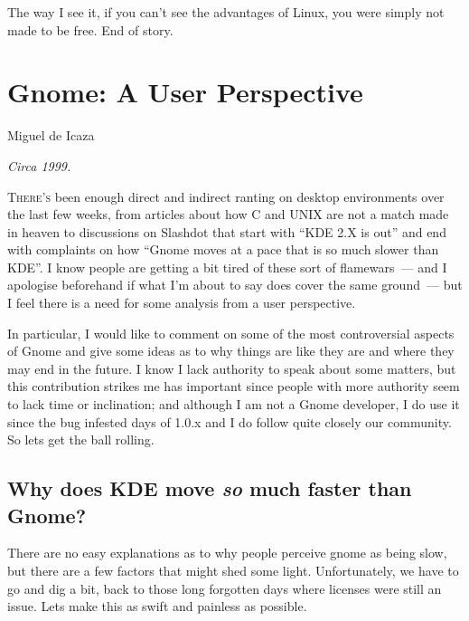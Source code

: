 \documentclass{memoir}
\begin{document}
The way I see it, if you can't see the advantages of Linux, you were
simply not made to be free. End of story.

\chapter{Gnome: A User Perspective}

\begin{epigraphs}
      {Miguel de Icaza}
\end{epigraphs}

\begin{flushright}
  \emph{Circa 1999.}
\end{flushright}

\lettrine{T}{here's} been enough direct and indirect ranting on
desktop environments over the last few weeks, from articles about how
C and UNIX are not a match made in heaven to discussions on Slashdot
that start with ``KDE 2.X is out'' and end with complaints on how
``Gnome moves at a pace that is so much slower than KDE''. I know
people are getting a bit tired of these sort of flamewars~--- and I
apologise beforehand if what I'm about to say does cover the same
ground~--- but I feel there is a need for some analysis from a user
perspective.

In particular, I would like to comment on some of the most
controversial aspects of Gnome and give some ideas as to why things
are like they are and where they may end in the future. I know I lack
authority to speak about some matters, but this contribution strikes
me has important since people with more authority seem to lack time or
inclination; and although I am not a Gnome developer, I do use it
since the bug infested days of 1.0.x and I do follow quite closely our
community. So lets get the ball rolling.

\section{Why does KDE move \emph{so} much faster than Gnome?}

There are no easy explanations as to why people perceive gnome as
being slow, but there are a few factors that might shed some
light. Unfortunately, we have to go and dig a bit, back to those long
forgotten days where licenses were still an issue. Lets make this as
swift and painless as possible.
\end{document}
